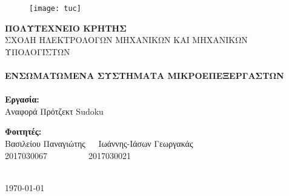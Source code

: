 \begin{titlepage}
\centering
\begin{figure}[h!]
\centering
\texttt{[image: tuc]}
\end{figure}
\textbf{\large ΠΟΛΥΤΕΧΝΕΙΟ ΚΡΗΤΗΣ}\\[0.3CM]
ΣΧΟΛΗ ΗΛΕΚΤΡΟΛΟΓΩΝ ΜΗΧΑΝΙΚΩΝ ΚΑΙ ΜΗΧΑΝΙΚΩΝ ΥΠΟΛΟΓΙΣΤΩΝ\\[1cm]
\HRule\\[0.15cm]
\Large{\textbf{ΕΝΣΩΜΑΤΩΜΕΝΑ ΣΥΣΤΗΜΑΤΑ ΜΙΚΡΟΕΠΕΞΕΡΓΑΣΤΩΝ}}\\[0.05cm]
\HRule\\[1cm]
\Large{\textbf{Εργασία:}}\\
\Large{Αναφορά Πρότζεκτ Sudoku}\\[1.5cm]
\begin{minipage}{0.9\textwidth}
\begin{flushleft}
\textbf{Φοιτητές:}\\
Βασιλείου Παναγιώτης$~~~~~~~$Ιωάννης-Ιάσων Γεωργακάς\\
2017030067$~~~~~~~~~~~~~~~~~~~~~~$2017030021\\[0.5cm]
\end{flushleft}
\end{minipage}\\[2cm]
{\large\today}\\
\end{titlepage}
